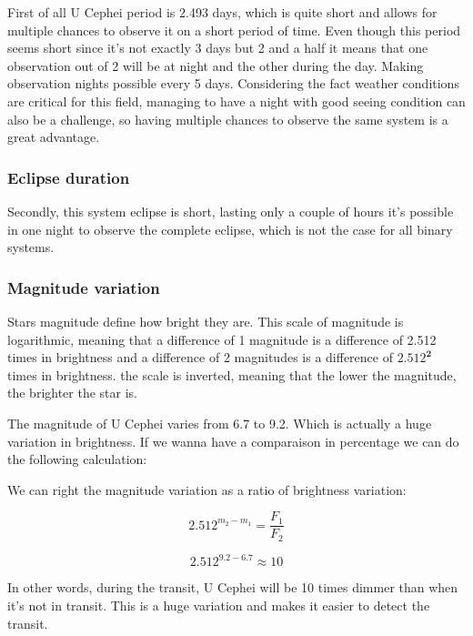 \documentclass[12pt,a4paper]{article}
\begin{document}
First of all U Cephei period is 2.493 days, which is quite short and allows for multiple chances to observe it on a short period of time. 
Even though this period seems short since it's not exactly 3 days but 2 and a half it means that one observation out of 2 will be at night and the other during the day.
Making observation nights possible every 5 days.
Considering the fact weather conditions are critical for this field, managing to have a night with good seeing condition can also be a challenge, so having multiple chances to observe the same system is a great advantage.

\subsubsection{Eclipse duration}

Secondly, this system eclipse is short, lasting only a couple of hours it's possible in one night to observe the complete eclipse, which is not the case for all binary systems.

\subsubsection{Magnitude variation}

Stars magnitude define how bright they are. This scale of magnitude is logarithmic, meaning that a difference of 1 magnitude is a difference of 2.512 times in brightness and a difference of 2 magnitudes is a difference of \(\mathbf{2.512^2}\) times in brightness.
the scale is inverted, meaning that the lower the magnitude, the brighter the star is.

The magnitude of U Cephei varies from 6.7 to 9.2. Which is actually a huge variation in brightness. If we wanna have a comparaison in percentage we can do the following calculation:

We can right the magnitude variation as a ratio of brightness variation:

\begin{equation}
     2.512^{m_2-m_1} = \frac{F_1}{F_2}
\end{equation}

\begin{equation}
    2.512^{9.2-6.7} \approx 10
\end{equation}

In other words, during the transit, U Cephei will be 10 times dimmer than when it's not in transit. This is a huge variation and makes it easier to detect the transit.
\end{document}
